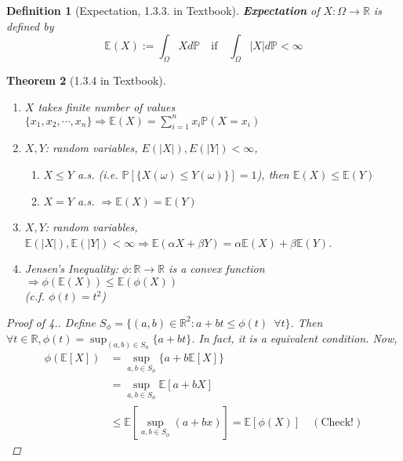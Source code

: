 \documentclass[12pt]{report}
\renewcommand{\1}{\mathbb{1}}
\theoremstyle{break}
\newtheorem{thm}{Theorem}[section] %
\theoremstyle{newdef}
\newtheorem{defn}[thm]{Definition} %
\theoremstyle{remark}
\begin{document}
\begin{defn}[Expectation, 1.3.3. in Textbook]
\textbf{Expectation} of $X : \Omega \rightarrow \mathbb{R}$ is defined by
$$\mathbb{E}(X) := \int_\Omega X d\mathbb{P} \quad \text{if} \quad \int_{\Omega}|X|d\mathbb{P} < \infty$$ 
\end{defn}

\begin{thm}[1.3.4 in Textbook]
\leavevmode
\vspace{-6mm}
\begin{enumerate}
\item $X$ takes finite number of values $\{x_1,x_2, \cdots, x_n\} \Rightarrow \mathbb{E}(X) = \sum_{i=1}^n x_i\mathbb{P}(X = x_i)$
\item $X, Y$: random variables, $E(|X|), E(|Y|) < \infty$,
\begin{enumerate}[label = (\roman*)]
\item $X \leq Y$ a.s. (i.e. $\mathbb{P}[\{X(\omega) \leq Y(\omega)\}]=1$), then $\mathbb{E}(X) \leq \mathbb{E}(Y)$
\item $X = Y$ a.s. $\Rightarrow \mathbb{E}(X) = \mathbb{E}(Y)$
\end{enumerate}
\item $X, Y$: random variables, $\mathbb{E}(|X|), \mathbb{E}(|Y|) < \infty \Rightarrow \mathbb{E}(\alpha X + \beta Y) = \alpha \mathbb{E}(X) + \beta \mathbb{E}(Y)$.
\item Jensen's Inequality: $\phi : \mathbb{R} \rightarrow \mathbb{R}$ is a convex function $\Rightarrow \phi(\mathbb{E}(X)) \leq \mathbb{E}(\phi(X))$\\
(c.f. $\phi(t) = t^2$)
\end{enumerate}

\begin{proof}[Proof of 4.]
Define $S_\phi = \{(a,b) \in \mathbb{R}^2 : a + bt \leq \phi(t) \enspace \forall t\}$.
Then $\forall t \in \mathbb{R}, \phi(t) = \sup_{(a,b) \in S_\phi} \{a+bt\}$.
In fact, it is a equivalent condition. Now,
$$
\begin{aligned}
\phi(\mathbb{E}[X]) &= \sup_{a,b\in S_\phi} \{a + b\mathbb{E}[X]\}\\
&= \sup_{a,b \in S_\phi} \mathbb{E}[a+bX]\\
&\leq \mathbb{E}[\sup_{a,b\in S_\phi}(a+bx)] = \mathbb{E}[\phi(X)] \quad (\text{Check!})
\end{aligned}
$$
\end{proof}
\end{thm}
\end{document}
